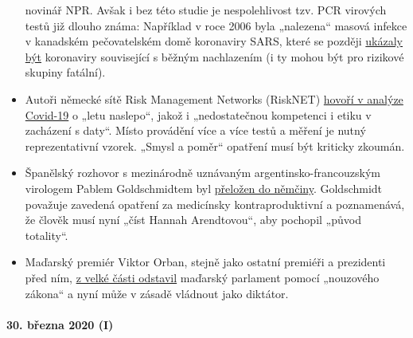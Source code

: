 \begin{itemize}
  novinář NPR. Avšak i bez této studie je nespolehlivost tzv. PCR
  virových testů již dlouho známa: Například v roce 2006 byla
  „nalezena`` masová infekce v kanadském pečovatelském domě koronaviry
  SARS, které se později
  \href{https://www.ncbi.nlm.nih.gov/pmc/articles/PMC2095096/}{ukázaly
  být} koronaviry související s běžným nachlazením (i ty mohou být pro
  rizikové skupiny fatální).
\item
  Autoři německé sítě Risk Management Networks (RiskNET)
  \href{https://www.risknet.de/themen/risknews/covid-19-und-der-blindflug/}{hovoří
  v analýze Covid-19} o „letu naslepo``, jakož i „nedostatečnou
  kompetenci i etiku v zacházení s daty``. Místo provádění více a více
  testů a měření je nutný reprezentativní vzorek. „Smysl a poměr``
  opatření musí být kriticky zkoumán.
\item
  Španělský rozhovor s mezinárodně uznávaným argentinsko-francouzským
  virologem Pablem Goldschmidtem byl
  \href{https://www.rubikon.news/artikel/der-corona-totalitarismus}{přeložen
  do němčiny}. Goldschmidt považuje zavedená opatření za medicínsky
  kontraproduktivní a poznamenává, že člověk musí nyní „číst Hannah
  Arendtovou``, aby pochopil „původ totality``.
\item
  Maďarský premiér Viktor Orban, stejně jako ostatní premiéři a
  prezidenti před ním, \href{https://www.krone.at/2127086}{z velké části
  odstavil} maďarský parlament pomocí „nouzového zákona`` a nyní může v
  zásadě vládnout jako diktátor.
\end{itemize}

\hypertarget{30-bux159ezna-2020-i}{%
\paragraph{30. března 2020 (I)}\label{30-bux159ezna-2020-i}}

